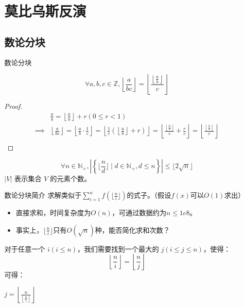 \section{莫比乌斯反演}
\subsection{数论分块}
\begin{frame}[fragile]{数论分块}
  \begin{lemma}
    $$
      \forall a,b,c\in\mathbb{Z},\left\lfloor\frac{a}{bc}\right\rfloor=\left\lfloor\frac{\left\lfloor\frac{a}{b}\right\rfloor}{c}\right\rfloor
    $$
  \end{lemma}

  \pause 
  \begin{proof}
    $$
    \begin{aligned}
      &\frac{a}{b}=\left\lfloor\frac{a}{b}\right\rfloor+r(0\leq r<1)\\
      \implies
      &\left\lfloor\frac{a}{bc}\right\rfloor
      =\left\lfloor\frac{a}{b}\cdot\frac{1}{c}\right\rfloor
      =\left\lfloor \frac{1}{c}\left(\left\lfloor\frac{a}{b}\right\rfloor+r\right)\right\rfloor
      =\left\lfloor \frac{\left\lfloor\frac{a}{b}\right\rfloor}{c} +\frac{r}{c}\right\rfloor
      =\left\lfloor \frac{\left\lfloor\frac{a}{b}\right\rfloor}{c}\right\rfloor\\
    \end{aligned}
    $$
  \end{proof}

  \pause 
  \begin{lemma}
    $$
    \forall n \in \mathbb{N}_{+},  \left|\left\{ \lfloor \frac{n}{d} \rfloor \mid d \in \mathbb{N}_{+},d\leq n \right\}\right| \leq \lfloor 2\sqrt{n} \rfloor
    $$
    $|V|$ 表示集合 $V$ 的元素个数。
  \end{lemma}
\end{frame}

\begin{frame}[fragile]{数论分块}{简介}
  求解类似于$\sum\limits_{i=1}^{n}f(\lfloor \frac{n}{i} \rfloor)$的式子。（假设$f(x)$可以$O(1)$求出）
  \begin{itemize}
    \item 直接求和，时间复杂度为$O(n)$，可通过数据约为$n\leq 1e8$。
    \item 事实上，$\lfloor \frac{n}{i} \rfloor$只有$O(\sqrt{n})$种，能否简化求和次数？
  \end{itemize}

  \pause 
  \vspace{0.3cm}
  对于任意一个 $i(i\leq n)$，我们需要找到一个最大的 $j(i\leq j\leq n)$，使得：
  $$
    \left\lfloor\frac{n}{i}\right\rfloor = \left\lfloor\frac{n}{j}\right\rfloor
  $$
  可得：
  \begin{center}
    $j=\left\lfloor\frac{n}{\left\lfloor\frac{n}{i}\right\rfloor}\right\rfloor$
  \end{center}
\end{frame}

